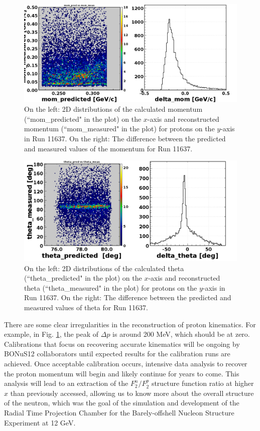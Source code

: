 \begin{figure}[h!]
	\centering
	\includegraphics[width=0.9\linewidth]{figures/rgf/11637/elastic_mom.png}
	\caption{On the left: 2D distributions of the calculated momentum (``mom\_predicted" in the plot) on the $x$-axis and reconstructed momentum (``mom\_measured" in the plot) for protons on the $y$-axis in Run 11637. On the right: The difference between the predicted and measured values of the momentum for Run 11637.}
	\label{fig:rgf_pmom}
\end{figure}
\begin{figure}[h!]
	\centering
	\includegraphics[width=0.9\linewidth]{figures/rgf/11637/ptheta.png}
	\caption{On the left: 2D distributions of the calculated theta (``theta\_predicted" in the plot) on the $x$-axis and reconstructed theta (``theta\_measured" in the plot) for protons on the $y$-axis in Run 11637. On the right: The difference between the predicted and measured values of theta for Run 11637.}
	\label{fig:rgf_ptheta}
\end{figure}

There are some clear irregularities in the reconstruction of proton kinematics. For example, in Fig. \ref{fig:rgf_pmom}, the peak of $\Delta p$ is around 200 MeV, which should be at zero. Calibrations that focus on recovering accurate kinematics will be ongoing by BONuS12 collaborators until expected results for the calibration runs are achieved. Once acceptable calibration occurs, intensive data analysis to recover the proton momentum will begin and likely continue for years to come. This analysis will lead to an extraction of the $F_2^n/F_2^p$ structure function ratio at higher $x$ than previously accessed, allowing us to know more about the overall structure of the neutron, which was the goal of the simulation and development of the Radial Time Projection Chamber for the Barely-offshell Nucleon Structure Experiment at 12 GeV.